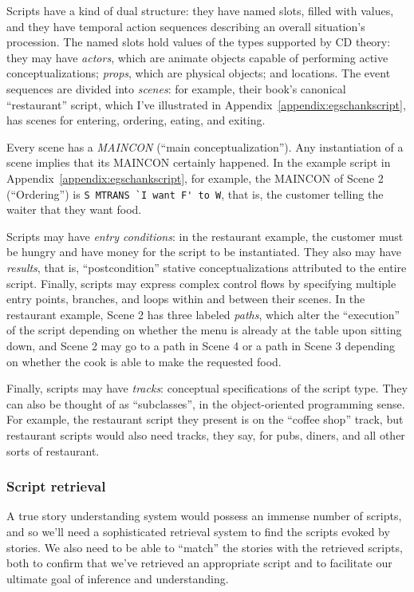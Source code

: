 Scripts have a kind of dual structure: they have named slots, filled with values, %
and they have temporal action sequences describing an overall situation's procession. The named slots hold values of the types supported by CD theory: they may have \textit{actors}, which are animate objects capable of performing active conceptualizations; \textit{props}, which are physical objects; and locations. The event sequences are divided into \textit{scenes}: for example, their book's canonical ``restaurant'' script, which I've illustrated in Appendix~\ref{appendix:egschankscript}, has scenes for entering, ordering, eating, and exiting.

Every scene has a \textit{MAINCON} (``main conceptualization''). Any instantiation of a scene implies that its MAINCON certainly happened. In the example script in Appendix~\ref{appendix:egschankscript}, for example, the MAINCON of Scene 2 (``Ordering'') is \lstinline{S MTRANS `I want F' to W}, that is, the customer telling the waiter that they want food.

Scripts may have \textit{entry conditions}: in the restaurant example, the customer must be hungry and have money for the script to be instantiated. They also may have \textit{results}, that is, ``postcondition'' stative conceptualizations attributed to the entire script. Finally, scripts may express complex control flows by specifying multiple entry points, branches, and loops within and between their scenes. In the restaurant example, Scene 2 has three labeled \textit{paths}, which alter the ``execution'' of the script depending on whether the menu is already at the table upon sitting down, and Scene 2 may go to a path in Scene 4 or a path in Scene 3 depending on whether the cook is able to make the requested food.

Finally, scripts may have \textit{tracks}: conceptual specifications of the script type. They can also be thought of as ``subclasses'', in the object-oriented programming sense. For example, the restaurant script they present is on the ``coffee shop'' track, but restaurant scripts would also need tracks, they say, for pubs, diners, and all other sorts of restaurant.

\subsubsection{Script retrieval}
A true story understanding system would possess an immense number of scripts, and so we'll need a sophisticated retrieval system to find the scripts evoked by stories. We also need to be able to ``match'' the stories with the retrieved scripts, both to confirm that we've retrieved an appropriate script and to facilitate our ultimate goal of inference and understanding.%

